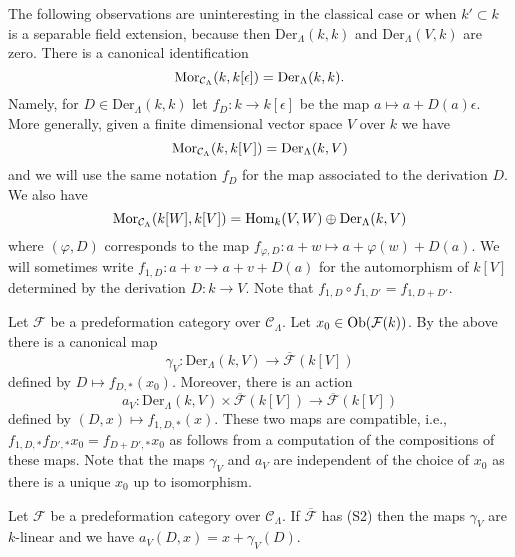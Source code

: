 \noindent
The following observations are uninteresting in the classical case or when
$k' \subset k$ is a separable field extension, because then
$\text{Der}_\Lambda(k, k)$ and $\text{Der}_\Lambda(V, k)$ are zero.
There is a canonical identification
$$
\mathop{\rm Mor}\nolimits_{\mathcal{C}_\Lambda}(k, k[\epsilon]) =
\text{Der}_\Lambda(k, k).
$$
Namely, for $D \in \text{Der}_\Lambda(k, k)$ let $f_D : k \to k[\epsilon]$
be the map $a \mapsto a + D(a)\epsilon$. More generally, given a finite
dimensional vector space $V$ over $k$ we have
$$
\mathop{\rm Mor}\nolimits_{\mathcal{C}_\Lambda}(k, k[V]) =
\text{Der}_\Lambda(k, V)
$$
and we will use the same notation $f_D$ for the map associated to the
derivation $D$. We also have
$$
\mathop{\rm Mor}\nolimits_{\mathcal{C}_\Lambda}(k[W], k[V]) =
\mathop{\rm Hom}\nolimits_k(V, W) \oplus \text{Der}_\Lambda(k, V)
$$
where $(\varphi, D)$ corresponds to the map
$f_{\varphi, D} : a + w \mapsto a + \varphi(w) + D(a)$. We will sometimes write
$f_{1, D} : a + v \to a + v + D(a)$ for the automorphism
of $k[V]$ determined by the derivation $D : k \to V$. Note that
$f_{1, D} \circ f_{1, D'} = f_{1, D + D'}$.

\medskip\noindent
Let $\mathcal{F}$ be a predeformation category over $\mathcal{C}_\Lambda$.
Let $x_0 \in \mathop{\rm Ob}\nolimits(\mathcal{F}(k))$. By the above there is a canonical
map
$$
\gamma_V :
\text{Der}_\Lambda(k, V)
\longrightarrow
\overline{\mathcal{F}}(k[V])
$$
defined by $D \mapsto f_{D, *}(x_0)$. Moreover, there is an action
$$
a_V : \text{Der}_\Lambda(k, V) \times \overline{\mathcal{F}}(k[V])
\longrightarrow
\overline{\mathcal{F}}(k[V])
$$
defined by $(D, x) \mapsto f_{1, D, *}(x)$. These two maps are compatible,
i.e., $f_{1, D, *}f_{D', *}x_0 = f_{D + D', *}x_0$ as follows from a
computation of the compositions of these maps. Note that the maps
$\gamma_V$ and $a_V$ are independent of the choice of $x_0$ as there
is a unique $x_0$ up to isomorphism.

\begin{lemma}
\label{lemma-action-linear}
Let $\mathcal{F}$ be a predeformation category over $\mathcal{C}_\Lambda$.
If $\overline{\mathcal{F}}$ has (S2) then the maps $\gamma_V$ are
$k$-linear and we have $a_V(D, x) = x + \gamma_V(D)$.
\end{lemma}

